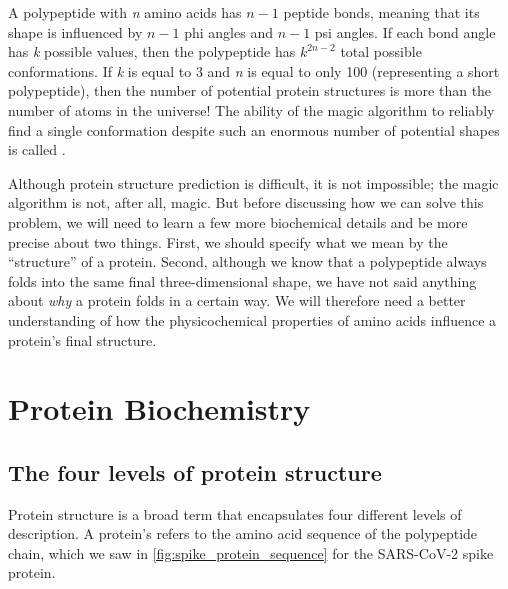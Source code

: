 A polypeptide with \textit{n} amino acids has $n - 1$ peptide bonds, meaning that its shape is influenced by $n - 1$ phi angles and $n - 1$ psi angles. If each bond angle has \textit{k} possible values, then the polypeptide has $k^{2n-2}$ total possible conformations. If \textit{k} is equal to 3 and \textit{n} is equal to only 100 (representing a short polypeptide), then the number of potential protein structures is more than the number of atoms in the universe! The ability of the magic algorithm to reliably find a single conformation despite such an enormous number of potential shapes is called .

Although protein structure prediction is difficult, it is not impossible; the magic algorithm is not, after all, magic. But before discussing how we can solve this problem, we will need to learn a few more biochemical details and be more precise about two things. First, we should specify what we mean by the ``structure'' of a protein. Second, although we know that a polypeptide always folds into the same final three-dimensional shape, we have not said anything about \textit{why} a protein folds in a certain way. We will therefore need a better understanding of how the physicochemical properties of amino acids influence a protein's final structure.\\

\FloatBarrier
{}

\section{Protein Biochemistry}

\FloatBarrier
{}
\subsection{The four levels of protein structure}

Protein structure is a broad term that encapsulates four different levels of description. A protein's  refers to the amino acid sequence of the polypeptide chain, which we saw in \autoref{fig:spike_protein_sequence} for the SARS-CoV-2 spike protein.

